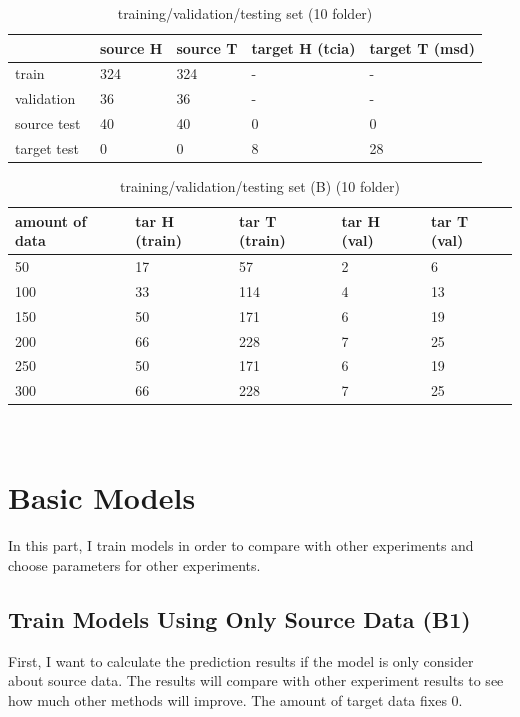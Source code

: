  \begin{table}[H]
\centering
\caption{training/validation/testing set (10 folder)}
\begin{tabular}{|l|l|l|l|l|} 
\hline
~            & source H & source T & target H (tcia) & target T (msd)  \\ 
\hline
train        & 324      & 324      & -               & -               \\ 
\hline
validation   & 36       & 36       & -               & -               \\ 
\hline
source test  & 40       & 40       & 0               & 0               \\ 
\hline
target test~ & 0        & 0        & 8               & 28              \\
\hline
\end{tabular}
\end{table}
\begin{table}[H]
\centering 
\caption{training/validation/testing set (B) (10 folder)}
\begin{tabular}{|l|l|l|l|l|} 
\hline
amount of data   & tar H (train) & tar T (train) & tar H (val) & tar T (val)  \\ 
\hline
50       & 17      & 57      & 2               & 6               \\ 
\hline
100 & 33       & 114       & 4               & 13               \\ 
\hline
150& 50       & 171       & 6               & 19               \\ 
\hline
200&66        & 228        & 7               & 25              \\
\hline
250& 50       & 171       & 6               & 19               \\ 
\hline
300&66        & 228        & 7               & 25              \\
\hline
\end{tabular}
\end{table}
 ~\\
\section{Basic Models}
In this part, I train models in order to compare with other experiments and choose parameters for other experiments.
\subsection{Train Models Using Only Source Data (B1)}
First, I want to calculate the prediction results if the model is only consider about source data. The results will compare with other experiment results to see how much other methods will improve. The amount of target data fixes 0.
